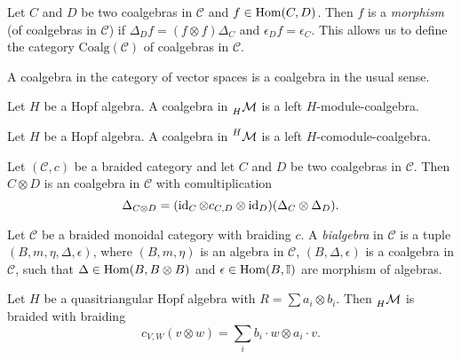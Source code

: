 \documentclass[12pt]{amsproc}
\newcommand{\lmod}[1]{\prescript{}{#1}{\mathcal{M}}}
\newcommand{\lcomod}[1]{\prescript{#1}{}{\mathcal{M}}}
\begin{document}
Let $C$ and $D$ be two coalgebras in $\mathcal{C}$ and $f\in\operatorname{Hom}(C,D)$.
Then $f$ is a \emph{morphism} (of coalgebras in $\mathcal{C}$)
if $\Delta_{D}f=(f\otimes f)\Delta_{C}$ and $\epsilon_{D}f=\epsilon_{C}$. 
This allows us to define the category $\mathrm{Coalg}(\mathcal{C})$
of coalgebras in $\mathcal{C}$.

\begin{example}
A coalgebra in the category of vector spaces 
is a coalgebra in the usual sense.
\end{example}

\begin{example}
Let $H$ be a Hopf algebra. 
A coalgebra in $\lmod{H}$ is a left $H$-module-coalgebra.
\end{example}


\begin{example}
Let $H$ be a Hopf algebra. 
A coalgebra in $\lcomod{H}$ 
is a left $H$-comodule-coalgebra.
\end{example}

\begin{example}
Let $(\mathcal{C},c)$ be a braided category and let $C$ and $D$ be two
coalgebras in $\mathcal{C}$. Then $C\otimes D$ is an coalgebra in $\mathcal{C}$
with comultiplication 
\[
\Delta_{C\otimes D}=(\operatorname{id}_C\otimes c_{C,D}\otimes \operatorname{id}_D)(\Delta_C\otimes\Delta_D).
\]
\end{example}

\begin{definition}
Let $\mathcal{C}$ be a braided monoidal category with braiding $c$.
A \emph{bialgebra} in $\mathcal{C}$ is a tuple $(B,m,\eta,\Delta,\epsilon)$,
where $(B,m,\eta)$ is an algebra in $\mathcal{C}$, $(B,\Delta,\epsilon)$
is a coalgebra in $\mathcal{C}$, such that $\Delta\in\operatorname{Hom}(B,B\otimes B)$
and $\epsilon\in\operatorname{Hom}(B,\mathbb{I})$ are morphism of algebras.
\end{definition}


\begin{exercise}
Let $H$ be a quasitriangular Hopf algebra with $R=\sum a_{i}\otimes b_{i}$.
Then $\lmod{H}$ is braided with braiding
\[
c_{V,W}(v\otimes w)=\sum_{i}b_{i}\cdot w\otimes a_{i}\cdot v.
\]
\end{exercise}
\end{document}
